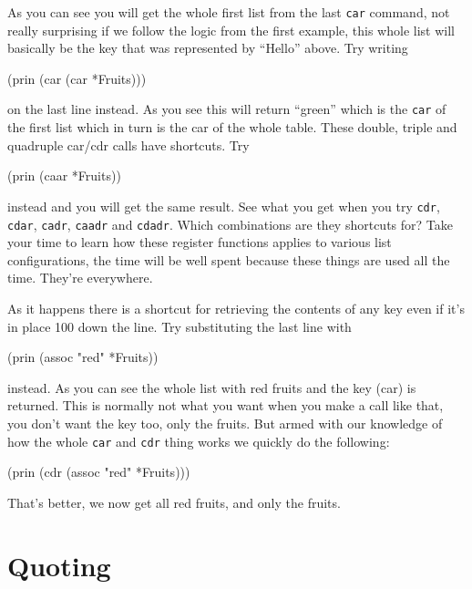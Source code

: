 As you can see you will get the whole first list from the last \texttt{car}
command, not really surprising if we follow the logic from the first
example, this whole list will basically be the key that was represented
by ``Hello'' above. Try writing


\begin{wideverbatim}
(prin (car (car *Fruits)))
\end{wideverbatim}

on the last line instead. As you see this will return ``green'' which is
the \texttt{car} of the first list which in turn is the car of the whole table.
These double, triple and quadruple car/cdr calls have shortcuts. Try


\begin{wideverbatim}
(prin (caar *Fruits))
\end{wideverbatim}

instead and you will get the same result. See what you get when you
try \texttt{cdr}, \texttt{cdar}, \texttt{cadr}, \texttt{caadr} and
\texttt{cdadr}. Which combinations are they shortcuts for? Take your
time to learn how these register functions applies to various list
configurations, the time will be well spent because these things are
used all the time. They're everywhere.

As it happens there is a shortcut for retrieving the contents of any key
even if it's in place 100 down the line. Try substituting the last line
with

\begin{wideverbatim}
(prin (assoc "red" *Fruits))
\end{wideverbatim}

instead. As you can see the whole list with red fruits and the key
(car) is returned. This is normally not what you want when you make a
call like that, you don't want the key too, only the fruits. But armed
with our knowledge of how the whole \texttt{car} and \texttt{cdr}
thing works we quickly do the following:


\begin{wideverbatim}
(prin (cdr (assoc "red" *Fruits)))
\end{wideverbatim}

That's better, we now get all red fruits, and only the fruits.

\section{Quoting}
\label{sec:reg-and-quot-quoting}

